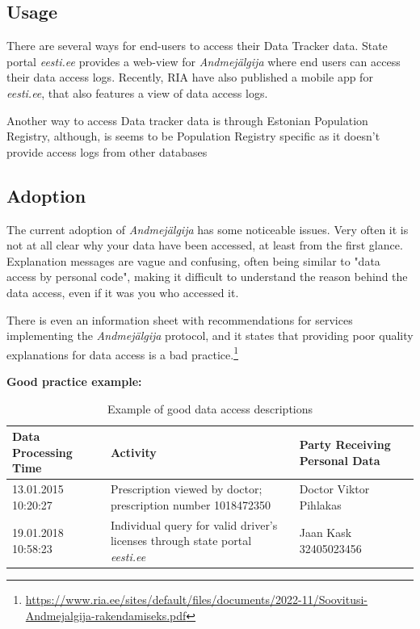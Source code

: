 \subsection{Usage}
There are several ways for end-users to access their Data Tracker data. State portal \textit{eesti.ee} provides a web-view for \textit{Andmejälgija} where end users can access their data access logs. Recently, RIA have also published a mobile app for \textit{eesti.ee}, that also features a view of data access logs. 

Another way to access Data tracker data is through Estonian Population Registry, although, is seems to be Population Registry specific as it doesn't provide access logs from other databases



\subsection{Adoption}
The current adoption of \textit{Andmejälgija} has some noticeable issues. Very often it is not at all clear why your data have been accessed, at least from the first glance. Explanation messages are vague and confusing, often being similar to "data access by personal code", making it difficult to understand the reason behind the data access, even if it was you who accessed it.

There is even an information sheet with recommendations for services implementing the \textit{Andmejälgija} protocol, and it states that providing poor quality explanations for data access is a bad practice.\footnote{\url{https://www.ria.ee/sites/default/files/documents/2022-11/Soovitusi-Andmejalgija-rakendamiseks.pdf}} 

\textbf{Good practice example:}

\begin{table}[H]
\centering
\begin{tabular}{|p{3cm}|p{6cm}|p{4cm}|}
\hline
\textbf{Data Processing Time} & \textbf{Activity} & \textbf{Party Receiving Personal Data} \\
\hline
13.01.2015 10:20:27 & Prescription viewed by doctor; prescription number 1018472350 & Doctor Viktor Pihlakas \\
\hline
19.01.2018 10:58:23 & Individual query for valid driver's licenses through state portal \textit{eesti.ee} & Jaan Kask 32405023456 \\
\hline
\end{tabular}
\caption{Example of good data access descriptions}
\end{table}

